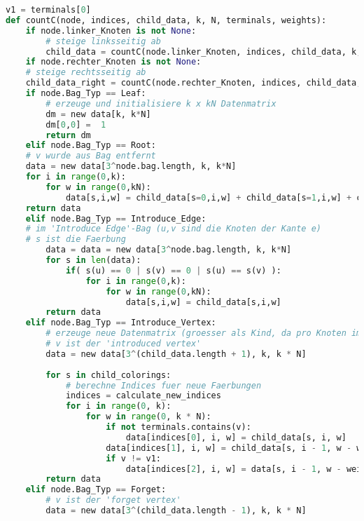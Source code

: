 \begin{svgraybox}
\begin{lstlisting}[language=python,label={code:pseudo}, basicstyle=\small, caption=Pseudocode für das dynamische Programm]
v1 = terminals[0]
def countC(node, indices, child_data, k, N, terminals, weights):
    if node.linker_Knoten is not None:
        # steige linksseitig ab
        child_data = countC(node.linker_Knoten, indices, child_data, k, N, terminals, weights)
    if node.rechter_Knoten is not None:
	# steige rechtsseitig ab
	child_data_right = countC(node.rechter_Knoten, indices, child_data, k, N, terminals, weights)
    if node.Bag_Typ == Leaf:
    	# erzeuge und initialisiere k x kN Datenmatrix
    	dm = new data[k, k*N]
    	dm[0,0] =  1
    	return dm
    elif node.Bag_Typ == Root:
	# v wurde aus Bag entfernt
	data = new data[3^node.bag.length, k, k*N]
	for i in range(0,k):
		for w in range(0,kN):
			data[s,i,w] = child_data[s=0,i,w] + child_data[s=1,i,w] + child_data[s=2,i,w]
	return data			
    elif node.Bag_Typ == Introduce_Edge:
	# im 'Introduce Edge'-Bag (u,v sind die Knoten der Kante e)
	# s ist die Faerbung
		data = data = new data[3^node.bag.length, k, k*N]
		for s in len(data):
			if( s(u) == 0 | s(v) == 0 | s(u) == s(v) ):
				for i in range(0,k):
					for w in range(0,kN):
						data[s,i,w] = child_data[s,i,w]
        return data
    elif node.Bag_Typ == Introduce_Vertex:
        # erzeuge neue Datenmatrix (groesser als Kind, da pro Knoten im Bag drei neue Faerbungen)
        # v ist der 'introduced vertex' 
        data = new data[3^(child_data.length + 1), k, k * N]
        
        for s in child_colorings:
        	# berechne Indices fuer neue Faerbungen
        	indices = calculate_new_indices
            for i in range(0, k):
                for w in range(0, k * N):
                    if not terminals.contains(v):
                        data[indices[0], i, w] = child_data[s, i, w]
                    data[indices[1], i, w] = child_data[s, i - 1, w - weights(v)]
                    if v != v1:
                        data[indices[2], i, w] = data[s, i - 1, w - weights.get(introduced_vertex)]
        return data
    elif node.Bag_Typ == Forget:
    	# v ist der 'forget vertex'
        data = new data[3^(child_data.length - 1), k, k * N]
		

\end{lstlisting}
\end{svgraybox}
